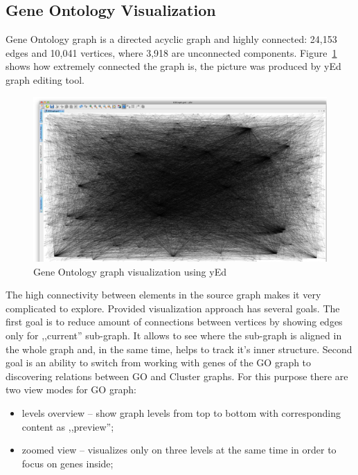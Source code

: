 \subsection{Gene Ontology Visualization}
\label{sec:go}

Gene Ontology graph is a directed acyclic graph and highly connected: 24,153 edges and 10,041 vertices, where 3,918 are unconnected components.
Figure~\ref{fig:go_connections_yEd} shows how extremely connected the graph is, the picture was produced by yEd graph editing tool.

\begin{figure}
\centering
\includegraphics[scale=0.2]{pictures/yEd_GO_2.png}
\caption{Gene Ontology graph visualization using yEd}
\label{fig:go_connections_yEd}
\end{figure}

The high connectivity between elements in the source graph makes it very complicated to explore. Provided visualization approach has several goals.
The first goal is to reduce amount of connections between vertices by showing edges only for ,,current'' sub-graph.
It allows to see where the sub-graph is aligned in the whole graph and, in the same time, helps to track it's inner structure.
Second goal is an ability to switch from working with genes of the GO graph to discovering relations between GO and Cluster graphs.
For this purpose there are two view modes for GO graph:

\begin{itemize}
   \item levels overview -- show graph levels from top to bottom with corresponding content as ,,preview'';
   \item zoomed view -- visualizes only on three levels at the same time in order to focus on genes inside;
\end{itemize}


